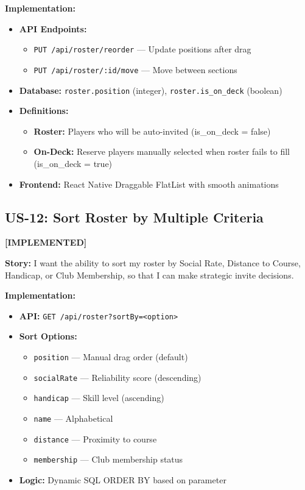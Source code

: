 \documentclass[11pt,a4paper]{article}
\newcommand{\implemented}{\textcolor{implemented}{\textbf{[IMPLEMENTED]}}}
\begin{document}
\textbf{Implementation:}
\begin{itemize}[leftmargin=*]
  \item \textbf{API Endpoints:}
    \begin{itemize}
      \item \texttt{PUT /api/roster/reorder} --- Update positions after drag
      \item \texttt{PUT /api/roster/:id/move} --- Move between sections
    \end{itemize}
  \item \textbf{Database:} \texttt{roster.position} (integer), \texttt{roster.is\_on\_deck} (boolean)
  \item \textbf{Definitions:}
    \begin{itemize}
      \item \textbf{Roster:} Players who will be auto-invited (is\_on\_deck = false)
      \item \textbf{On-Deck:} Reserve players manually selected when roster fails to fill (is\_on\_deck = true)
    \end{itemize}
  \item \textbf{Frontend:} React Native Draggable FlatList with smooth animations
\end{itemize}

\subsection{US-12: Sort Roster by Multiple Criteria}
\implemented

\textbf{Story:} I want the ability to sort my roster by Social Rate, Distance to Course, Handicap, or Club Membership, so that I can make strategic invite decisions.

\textbf{Implementation:}
\begin{itemize}[leftmargin=*]
  \item \textbf{API:} \texttt{GET /api/roster?sortBy=<option>}
  \item \textbf{Sort Options:}
    \begin{itemize}
      \item \texttt{position} --- Manual drag order (default)
      \item \texttt{socialRate} --- Reliability score (descending)
      \item \texttt{handicap} --- Skill level (ascending)
      \item \texttt{name} --- Alphabetical
      \item \texttt{distance} --- Proximity to course
      \item \texttt{membership} --- Club membership status
    \end{itemize}
  \item \textbf{Logic:} Dynamic SQL ORDER BY based on parameter
\end{itemize}
\end{document}
